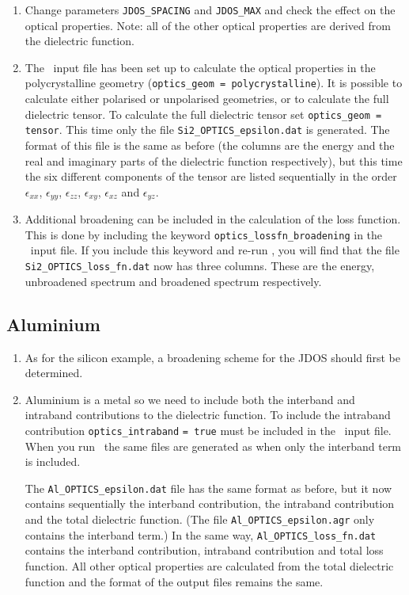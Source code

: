 \documentclass[a4paper,11pt,twoside]{book}
\begin{document}
{\begin{enumerate}
\item Change parameters \verb#JDOS_SPACING# and \verb#JDOS_MAX# and check the effect on the optical properties.  Note: all of the other optical properties are derived from the dielectric function.  

\item  The \optados\ input file has been set up to calculate the optical properties in the polycrystalline geometry (\verb#optics_geom = polycrystalline#).  It is possible to calculate either polarised or unpolarised geometries, or to calculate the full dielectric tensor.  To calculate the full dielectric tensor set \verb#optics_geom = tensor#.  This time only the file \verb#Si2_OPTICS_epsilon.dat# is generated.  The format of this file is the same as before (the columns are the energy and the real and imaginary parts of the dielectric function respectively), but this time the six different components of the tensor are listed sequentially in the order $\epsilon_{xx}$, $\epsilon_{yy}$, $\epsilon_{zz}$, $\epsilon_{xy}$, $\epsilon_{xz}$ and $\epsilon_{yz}$.

\item Additional broadening can be included in the calculation of the loss function.  This is done by including the keyword \verb#optics_lossfn_broadening# in the \optados\ input file.  If you include this keyword and re-run \optados, you will find that the file \verb#Si2_OPTICS_loss_fn.dat# now has three columns.  These are the energy, unbroadened spectrum and broadened spectrum respectively.  

\end{enumerate}

\subsection{Aluminium}
\begin{enumerate}
\item As for the silicon example, a broadening scheme for the JDOS should first be determined.  
\item Aluminium is a metal so we need to include both the interband and intraband contributions to the dielectric function.  To include the intraband contribution \verb#optics_intraband# \verb#= true# must be included in the \optados\ input file.  When you run \optados\, the same files are generated as when only the interband term is included.  

The \verb#Al_OPTICS_epsilon.dat# file has the same format as before, but it now contains sequentially the interband contribution, the intraband contribution and the total dielectric function.  (The file \verb#Al_OPTICS_epsilon.agr# only contains the interband term.)  In the same way, \verb#Al_OPTICS_loss_fn.dat# contains the interband contribution, intraband contribution and total loss function.  All other optical properties are calculated from the total dielectric function and the format of the output files remains the same.


\end{enumerate}}
\end{document}
